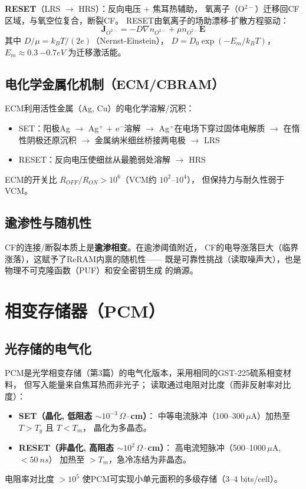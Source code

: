 \documentclass[11pt,a4paper,twoside]{article}
\theoremstyle{definition}\newtheorem{definition}{定义}[section]
\theoremstyle{plain}\newtheorem{theorem}{定理}[section]
\theoremstyle{remark}\newtheorem{remark}{注解}[section]
\begin{document}
\textbf{RESET}（LRS $\to$ HRS）：反向电压 + 焦耳热辅助，
氧离子（O$^{2-}$）迁移回CF区域，与氧空位复合，断裂CF。
RESET由氧离子的场助漂移-扩散方程驱动：
\begin{equation}\label{eq:ion-transport}
  \mathbf{J}_{O^{2-}} = -D \nabla n_{O^{2-}} + \mu n_{O^{2-}} \mathbf{E}
\end{equation}
其中 $D/\mu = k_B T / (2e)$（Nernst-Einstein），
$D = D_0 \exp(-E_m/k_B T)$，$E_m \approx \SI{0.3}{-0.7}{eV}$ 为迁移激活能。

\subsection{电化学金属化机制（ECM/CBRAM）}

ECM利用活性金属（Ag, Cu）的电化学溶解/沉积：
\begin{itemize}
  \item SET：阳极Ag $\to$ Ag$^+$ + e$^-$溶解 $\to$
  Ag$^+$在电场下穿过固体电解质 $\to$ 在惰性阴极还原沉积 $\to$
  金属纳米细丝桥接两电极 $\to$ LRS
  \item RESET：反向电压使细丝从最脆弱处溶解 $\to$ HRS
\end{itemize}
ECM的开关比 $R_{OFF}/R_{ON} > 10^6$（VCM约 $10^2$--$10^4$），
但保持力与耐久性弱于VCM。

\subsection{逾渗性与随机性}

CF的连接/断裂本质上是\textbf{逾渗相变}。在逾渗阈值附近，
CF的电导涨落巨大（临界涨落），这赋予了ReRAM内禀的随机性——
既是可靠性挑战（读取噪声大），也是物理不可克隆函数（PUF）和安全密钥生成
的熵源。

\section{相变存储器（PCM）}
\label{sec:pcms}

\subsection{光存储的电气化}

PCM是光学相变存储（第3篇）的电气化版本，采用相同的GST-225硫系相变材料，
但写入能量来自焦耳热而非光子；
读取通过电阻对比度（而非反射率对比度）：
\begin{itemize}
  \item \textbf{SET（晶化, 低阻态 $\sim 10^{-3}\,\Omega\cdot$cm）}：
  中等电流脉冲（100--300\,$\mu$A）加热至 $T > T_g$ 且 $T < T_m$，
  晶化为多晶态。
  \item \textbf{RESET（非晶化, 高阻态 $\sim 10^{2}\,\Omega\cdot$cm）}：
  高电流短脉冲（500--1000\,$\mu$A, $< \SI{50}{ns}$）
  加热至 $> T_m$，急冷冻结为非晶态。
\end{itemize}
电阻率对比度 $> 10^5$ 使PCM可实现小单元面积的多级存储（3--4 bits/cell）。
\end{document}
